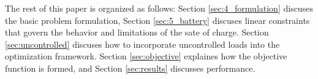 \par The rest of this paper is organized as follows: Section \ref{sec:4_formulation} discuses the basic problem formulation, Section \ref{sec:5_battery} discuses linear constraints that govern the behavior and limitations of the sate of charge. Section \ref{sec:uncontrolled} discuses how to incorporate uncontrolled loads into the optimization framework. Section \ref{sec:objective} explaines how the objective function is formed, and Section \ref{sec:results} discusses performance.
